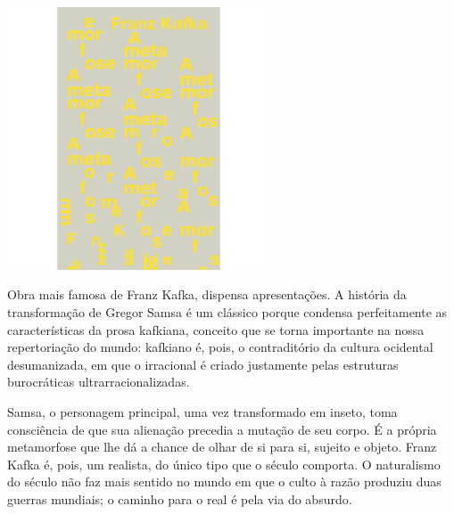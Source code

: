 \begin{center}
\hspace*{.5cm}\includegraphics[width=78mm]{./grid/kafka.png}
\end{center}

\hspace*{-7cm}\hrulefill\hspace*{-7cm}

\medskip

\noindent{}Obra mais famosa de Franz Kafka, {} dispensa apresentações. A história da transformação de Gregor Samsa é um clássico porque condensa perfeitamente as características da prosa kafkiana, conceito que se torna importante na nossa repertoriação do mundo: kafkiano é, pois, o contraditório da cultura ocidental desumanizada, em que o irracional é criado justamente pelas estruturas burocráticas ultrarracionalizadas.

Samsa, o personagem principal, uma vez transformado em inseto, toma consciência de que sua alienação precedia a mutação de seu corpo. É a própria metamorfose que lhe dá a chance de olhar de si para si, sujeito e objeto. Franz Kafka é, pois, um realista, do único tipo que o século  comporta. O naturalismo do século  não faz mais sentido no mundo em que o culto à razão produziu duas guerras mundiais; o caminho para o real é pela via do absurdo.


\vfill
\enlargethispage{\baselineskip}

\hspace*{-.4cm}\begin{minipage}[c]{.5\linewidth}
\small{
{}}
\end{minipage}


